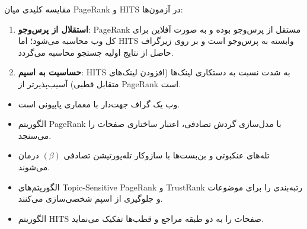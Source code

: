 \begin{examnote}
مقایسه کلیدی میان PageRank و HITS در آزمون‌ها:
\begin{enumerate}
    \item \textbf{استقلال از پرس‌وجو}: PageRank مستقل از پرس‌وجو بوده و به صورت آفلاین برای کل وب محاسبه می‌شود؛ اما HITS وابسته به پرس‌وجو است و بر روی زیرگراف حاصل از نتایج اولیه جستجو محاسبه می‌گردد.
    \item \textbf{حساسیت به اسپم}: HITS به شدت نسبت به دستکاری لینک‌ها (افزودن لینک‌های متقابل قطبی) آسیب‌پذیرتر از PageRank است.
\end{enumerate}
\end{examnote}

\begin{summarybox}
\begin{itemize}
    \item وب یک گراف جهت‌دار با معماری پاپیونی است.
    \item الگوریتم PageRank با مدل‌سازی گردش تصادفی، اعتبار ساختاری صفحات را می‌سنجد.
    \item تله‌های عنکبوتی و بن‌بست‌ها با سازوکار تله‌پورتیشن تصادفی $(\beta)$ درمان می‌شوند.
    \item الگوریتم‌های Topic-Sensitive PageRank و TrustRank رتبه‌بندی را برای موضوعات و جلوگیری از اسپم شخصی‌سازی می‌کنند.
    \item الگوریتم HITS صفحات را به دو طبقه مراجع و قطب‌ها تفکیک می‌نماید.
\end{itemize}
\end{summarybox}
